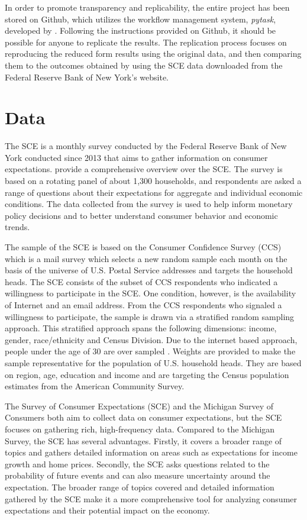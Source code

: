 \documentclass[11pt,a4paper,leqno]{article}
\begin{document}
In order to promote transparency and replicability, the entire project has been stored on Github, which utilizes the workflow management system, \textit{pytask}, developed by \textcite{Raabe2020}.  Following the instructions provided on Github, it should be possible for anyone  to replicate the results. The replication process focuses on reproducing the reduced form results using the original data, and then comparing them to the outcomes obtained by using the SCE data downloaded from the Federal Reserve Bank of New York's website.

\section{Data} %
The SCE is a monthly survey conducted by the Federal Reserve Bank of New York conducted since 2013 that aims to gather information on consumer expectations. \textcite{SCEOverview} provide a comprehensive overview over the SCE. The survey is based on a rotating panel of about 1,300 households, and respondents are asked a range of questions about their expectations for aggregate and individual economic conditions. The data collected from the survey is used to help inform monetary policy decisions and to better understand consumer behavior and economic trends.

The sample of the SCE is based on the Consumer Confidence Survey (CCS) which is a mail survey which selects a new random sample each month on the basis of the universe of U.S. Postal Service addresses and targets the household heads. The SCE consists of the subset of CCS respondents who indicated a willingness to participate in the SCE. One condition, however, is the availability of Internet and an email address. From the CCS respondents who signaled a willingness to participate, the sample is drawn via a stratified random sampling approach. This stratified approach spans the following dimensions: income, gender, race/ethnicity and Census Division.   Due to the internet based approach, people under the age of 30 are over sampled \parencite{SCEOverview}. Weights are provided to make the sample representative for the population of U.S. household heads. They are based on region, age, education and income and are targeting the Census population estimates from the American Community Survey. 

The Survey of Consumer Expectations (SCE) and the Michigan Survey of Consumers both aim to collect data on consumer expectations, but the SCE focuses on gathering rich, high-frequency data. Compared to the Michigan Survey, the SCE has several advantages. Firstly, it covers a broader range of topics and gathers detailed information on areas such as expectations for income growth and home prices. Secondly, the SCE asks questions related to the probability of future events and can also measure uncertainty around the expectation. The broader range of topics covered and detailed information gathered by the SCE make it a more comprehensive tool for analyzing consumer expectations and their potential impact on the economy.
\end{document}
